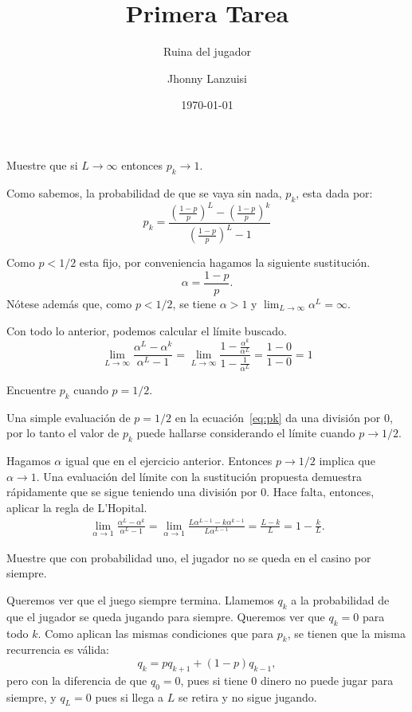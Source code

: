 \documentclass{scrartcl}
\begin{document}
%
\title{Primera Tarea}
\subtitle{Ruina del jugador}
\subject{Aplicación a los procesos estocásticos discretos}
\titlehead{Universidad Simón Bolívar\hfill Caracas, Venezuela}
\author{Jhonny Lanzuisi}
\date{\today}
\maketitle

\exercise
Muestre que si $L\to\infty$ entonces $p_k\to1$.

\solution
Como sabemos, la probabilidad de que se vaya sin nada, $p_k$,
esta dada por:
\begin{equation}\label{eq:pk}
	p_k = \frac{
		\left(\frac{1-p}{p}\right)^L - \left(\frac{1-p}{p}\right)^k
	}{
		\left(\frac{1-p}{p}\right)^L - 1
	}
\end{equation}

Como $p < 1/2$ esta fijo, por conveniencia hagamos la siguiente sustitución.
\[
	\alpha = \frac{1-p}{p}.
\]
Nótese además que, como $p < 1/2$, se tiene $\alpha > 1$ y $\lim_{L\to\infty} \alpha^L = \infty$.

Con todo lo anterior, podemos calcular el límite buscado.
\[
	\lim_{L\to\infty} \frac{
		\alpha^L - \alpha^k
	}{
		\alpha^L - 1
	}
	=
	\lim_{L\to\infty} \frac{
		1 - \frac{\alpha^k}{\alpha^L}
	}{
		1 - \frac{1}{\alpha^L}
	}
	=
	\frac{1 - 0}{1 - 0}
	=
	1
\]

\exercise
Encuentre $p_k$ cuando $p=1/2$.

\solution
Una simple evaluación de $p=1/2$ en la ecuación~\ref{eq:pk} da una división por $0$,
por lo tanto el valor de $p_k$ puede hallarse considerando el límite cuando $p\to1/2$.

Hagamos $\alpha$ igual que en el ejercicio anterior. Entonces $p\to1/2$ implica que
$\alpha\to1$. Una evaluación del límite con la sustitución propuesta demuestra rápidamente
que se sigue teniendo una división por $0$. Hace falta, entonces, aplicar la regla de L'Hopital.
\begin{align*}
	\lim_{\alpha\to1} \frac{
		\alpha^L - \alpha^k
	}{
		\alpha^L - 1
	}
	=
	\lim_{\alpha\to1} \frac{
		L\alpha^{L-1} - k\alpha^{k-1}
	}{
		L\alpha^{L-1}
	}
	=
	\frac{L - k}{L}
	= 1 - \frac{k}{L}.
\end{align*}

\exercise
Muestre que con probabilidad uno, el jugador no se queda en
el casino por siempre.

\solution
Queremos ver que el juego siempre termina. Llamemos $q_k$ a la probabilidad
de que el jugador se queda jugando para siempre. Queremos ver que $q_k = 0$ para
todo $k$. Como aplican las mismas condiciones que para $p_k$, se tienen que la misma
recurrencia es válida:
\[
	q_k = pq_{k+1} + (1-p)q_{k-1},
\]
pero con la diferencia de que $q_0=0$, pues si tiene $0$ dinero no puede jugar para siempre,
y $q_L = 0$ pues si llega a $L$ se retira y no sigue jugando.
\end{document}
